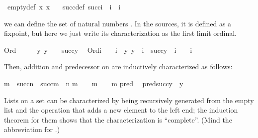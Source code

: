 \begin{isabelle}
\ empty{\uscore}{\kern0pt}def{\isacharprime}{\kern0pt}{\isacharcolon}{\kern0pt}\ {\isachardoublequoteopen}{\isasymforall}x{\isachardot}{\kern0pt}\ x\ {\isasymnotin}\ {}{\isachardoublequoteclose}%
\isanewline
{}
\ succ{\uscore}{\kern0pt}def{\isacharprime}{\kern0pt}{\isacharcolon}{\kern0pt}\ {\isachardoublequoteopen}succ{\isacharparenleft}{\kern0pt}i{\isacharparenright}{\kern0pt}\ {\isacharequal}{\kern0pt}\ i\ {\isasymunion}\ {\isacharbraceleft}{\kern0pt}i{\isacharbraceright}{\kern0pt}{\isachardoublequoteclose}%
\end{isabelle}
%
we can define the set of natural numbers \isa{{\isasymomega}}. In the
sources, it is  defined as a fixpoint, but here we just write
its characterization as the first limit ordinal.%
\begin{isabelle}%
Ord{\isacharparenleft}{\kern0pt}{\isasymomega}{\isacharparenright}{\kern0pt}\ {\isasymand}\ {}\ {\isacharless}{\kern0pt}\ {\isasymomega}\ {\isasymand}\ {\isacharparenleft}{\kern0pt}{\isasymforall}y{\isachardot}{\kern0pt}\ y\ {\isacharless}{\kern0pt}\ {\isasymomega}\ {\isasymlongrightarrow}\ succ{\isacharparenleft}{\kern0pt}y{\isacharparenright}{\kern0pt}\ {\isacharless}{\kern0pt}\ {\isasymomega}{\isacharparenright}{\kern0pt}\isasep\isanewline%
Ord{\isacharparenleft}{\kern0pt}i{\isacharparenright}{\kern0pt}\ {\isasymand}\ {}\ {\isacharless}{\kern0pt}\ i\ {\isasymand}\ {\isacharparenleft}{\kern0pt}{\isasymforall}y{\isachardot}{\kern0pt}\ y\ {\isacharless}{\kern0pt}\ i\ {\isasymlongrightarrow}\ succ{\isacharparenleft}{\kern0pt}y{\isacharparenright}{\kern0pt}\ {\isacharless}{\kern0pt}\ i{\isacharparenright}{\kern0pt}\ {\isasymLongrightarrow}\ {\isasymomega}\ {\isasymle}\ i%
\end{isabelle}%
Then, addition and predecessor on \isa{{\isasymomega}} are inductively
characterized as follows:%
\begin{isabelle}%
m\ {\isacharplus}{\kern0pt}\isactrlsub {\isasymomega}\ succ{\isacharparenleft}{\kern0pt}n{\isacharparenright}{\kern0pt}\ {\isacharequal}{\kern0pt}\ succ{\isacharparenleft}{\kern0pt}m\ {\isacharplus}{\kern0pt}\isactrlsub {\isasymomega}\ n{\isacharparenright}{\kern0pt}\isasep\isanewline%
m\ {\isasymin}\ {\isasymomega}\ {\isasymLongrightarrow}\ m\ {\isacharplus}{\kern0pt}\isactrlsub {\isasymomega}\ {}\ {\isacharequal}{\kern0pt}\ m\isasep\isanewline\isanewline%
pred{\isacharparenleft}{\kern0pt}{}{\isacharparenright}{\kern0pt}\ {\isacharequal}{\kern0pt}\ {}\isasep\isanewline%
pred{\isacharparenleft}{\kern0pt}succ{\isacharparenleft}{\kern0pt}y{\isacharparenright}{\kern0pt}{\isacharparenright}{\kern0pt}\ {\isacharequal}{\kern0pt}\ y%
\end{isabelle}%
Lists on a set  can be characterized by being
recursively generated from the empty list \isa{{\isacharbrackleft}{\kern0pt}{\isacharbrackright}{\kern0pt}} and the
operation  that adds a new element to the left end;
the induction theorem for them shows that the characterization is
“complete”. (Mind the
abbreviation for
.)

